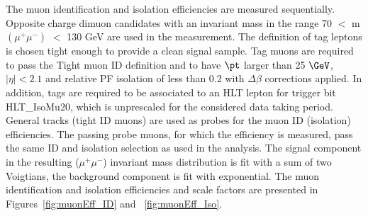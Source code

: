 The muon identification and isolation efficiencies are measured sequentially. Opposite charge dimuon candidates with an invariant mass in the range 70 $<$ m$(\mu^{+}\mu^{-})$ $<$ 130 GeV are used in the measurement. The definition of tag leptons is chosen tight enough to provide a clean signal sample. Tag muons are required to pass the Tight muon ID definition and to have $\pt$ larger than 25 $\GeV$, $|\eta| < 2.1$ and relative PF isolation of less than 0.2 with $\Delta\beta$ corrections applied. In addition, tags are required to be associated to an HLT lepton for trigger bit HLT\_IsoMu20, which is unprescaled for the considered data taking period. General tracks (tight ID muons) are used as probes for the muon ID (isolation) efficiencies. The passing probe muons, for which the efficiency is measured, pass the same ID and isolation selection as used in the analysis. 
The signal component in the resulting
($\mu^{+}\mu^{-}$) invariant mass distribution is fit with a sum of
two Voigtians, the background component is fit with exponential. The muon identification and isolation efficiencies and scale factors are presented in 
Figures~\ref{fig:muonEff_ID} and ~\ref{fig:muonEff_Iso}. 


